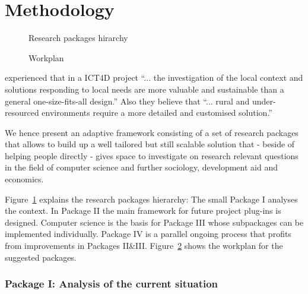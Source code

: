\documentclass[11pt]{article}
\begin{document}
\section{Methodology}\label{methodology}
\begin{figure}
\begin{center}
 
\end{center}
\caption{Research packages hirarchy}
\label{tikz:researchpackages}
\end{figure} 

\begin{figure}
\begin{center}
 
\end{center}
\caption{Workplan}
\label{tikz:workplan}
\end{figure} 

\citet{champanis2012reporting} experienced that in a ICT4D project ``... the investigation of
the local context and solutions responding to local needs are more
valuable and sustainable than a general one-size-fits-all design.'' Also they believe that ``... rural
and under-resourced environments require a more detailed and
customised solution.''

We hence present an adaptive framework consisting of a set of research packages that allows to build up a well tailored but still scalable solution that - beside of helping people directly -  gives space to investigate on research relevant questions in the field of computer science and further sociology, development aid and economics. 

Figure~\ref{tikz:researchpackages} explains the research packages hierarchy: The small Package I analyses the context. In Package II the main framework for future project plug-ins is designed. Computer science is the basis for Package III whose subpackages can be implemented individually. Package IV is a parallel ongoing process that profits from improvements in Packages II\&III. Figure~\ref{tikz:workplan} shows the workplan for the suggested packages.


\subsubsection*{Package I: Analysis of the current situation}
\end{document}
